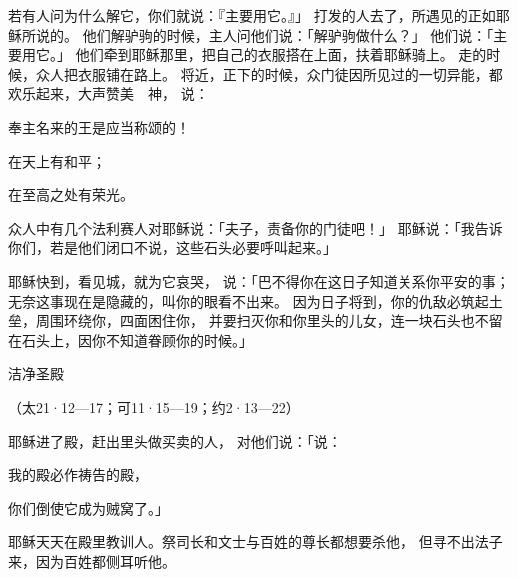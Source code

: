 {若有人问为什么解它，你们就说：『主要用它。』」
打发的人去了，所遇见的正如耶稣所说的。
他们解驴驹的时候，主人问他们说：「解驴驹做什么？」
他们说：「主要用它。」
他们牵到耶稣那里，把自己的衣服搭在上面，扶着耶稣骑上。
走的时候，众人把衣服铺在路上。
将近{}，正下{}的时候，众门徒因所见过的一切异能，都欢乐起来，大声赞美　神，
说：
\par }{\Q 奉主名来的王是应当称颂的！
\par }{\Q 在天上有和平；
\par }{\Q 在至高之处有荣光。
\par }{\PP {}众人中有几个法利赛人对耶稣说：「夫子，责备你的门徒吧！」
耶稣说：「我告诉你们，若是他们闭口不说，这些石头必要呼叫起来。」
\par }{\PP {}耶稣快到{}，看见城，就为它哀哭，
说：「巴不得你在这日子知道关系你平安的事；无奈这事现在是隐藏的，叫你的眼看不出来。
因为日子将到，你的仇敌必筑起土垒，周围环绕你，四面困住你，
并要扫灭你和你里头的儿女，连一块石头也不留在石头上，因你不知道眷顾你的时候。」
\par }{\SH 洁净圣殿
\par }{\R （太21·12—17；可11·15—19；约2·13—22）
\par }{\PP {}耶稣进了殿，赶出里头做买卖的人，
对他们说：「{}说：
\par }{\Q 我的殿必作祷告的殿，
\par }{\Q 你们倒使它成为贼窝了。」
\par }{\PP {}耶稣天天在殿里教训人。祭司长和文士与百姓的尊长都想要杀他，
但寻不出法子来，因为百姓都侧耳听他。

}

